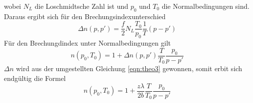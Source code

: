 wobei $N_L$ die Loschmidtsche Zahl ist und $p_0$ und $T_0$ die Normalbedingungen sind.
Daraus ergibt sich für den Brechungsindexunterschied
\begin{equation}
    \Delta n(p,p') = \frac{f}{2} N_L \frac{T_0}{p_0}\frac{1}{T}(p-p')
\end{equation}
Für den Brechungdindex unter Normalbedingungen gilt
\begin{equation}
    n(p_0,T_0) = 1 + \Delta n(p,p') \frac{T}{T_0}\frac{p_0}{p-p'}
\end{equation}
$\Delta n$ wird aus der umgestellten Gleichung \eqref{eqn:theo3} gewonnen, somit erbit sich endgültig die Formel
\begin{equation}
    n(p_0,T_0) = 1 + \frac{z \lambda}{2b} \frac{T}{T_0} \frac{p_0}{p-p'}
\end{equation}